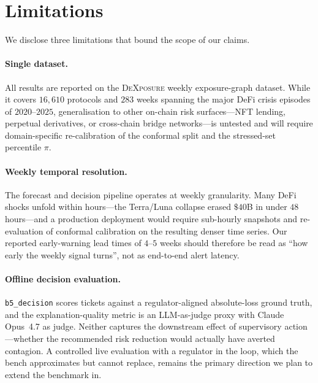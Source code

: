 \section{Limitations}
\label{sec:limitations}

We disclose three limitations that bound the scope of our claims.

\paragraph{Single dataset.} All results are reported on the \textsc{DeXposure} weekly exposure-graph dataset. While it covers $16{,}610$ protocols and $283$ weeks spanning the major DeFi crisis episodes of $2020$--$2025$, generalisation to other on-chain risk surfaces---NFT lending, perpetual derivatives, or cross-chain bridge networks---is untested and will require domain-specific re-calibration of the conformal split and the stressed-set percentile $\pi$.

\paragraph{Weekly temporal resolution.} The forecast and decision pipeline operates at weekly granularity. Many DeFi shocks unfold within hours---the Terra/Luna collapse erased $\$40$B in under $48$ hours---and a production deployment would require sub-hourly snapshots and re-evaluation of conformal calibration on the resulting denser time series. Our reported early-warning lead times of $4$--$5$ weeks should therefore be read as ``how early the weekly signal turns'', not as end-to-end alert latency.

\paragraph{Offline decision evaluation.} \texttt{b5\_decision} scores tickets against a regulator-aligned absolute-loss ground truth, and the explanation-quality metric is an LLM-as-judge proxy with Claude Opus~4.7 as judge. Neither captures the downstream effect of supervisory action---whether the recommended risk reduction would actually have averted contagion. A controlled live evaluation with a regulator in the loop, which the bench approximates but cannot replace, remains the primary direction we plan to extend the benchmark in.
